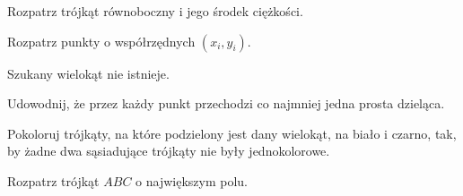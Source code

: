 
\begin{hints_list}
	\item Rozpatrz trójkąt równoboczny i jego środek ciężkości.
	\item Rozpatrz punkty o współrzędnych $(x_i, y_i)$.
	\item Szukany wielokąt nie istnieje.
	\item Udowodnij, że przez każdy punkt przechodzi co najmniej jedna prosta dzieląca.
	\item Pokoloruj trójkąty, na które podzielony jest dany wielokąt, na biało i czarno, tak, by żadne dwa sąsiadujące trójkąty nie były jednokolorowe.
	\item Rozpatrz trójkąt $ABC$ o największym polu.
\end{hints_list}